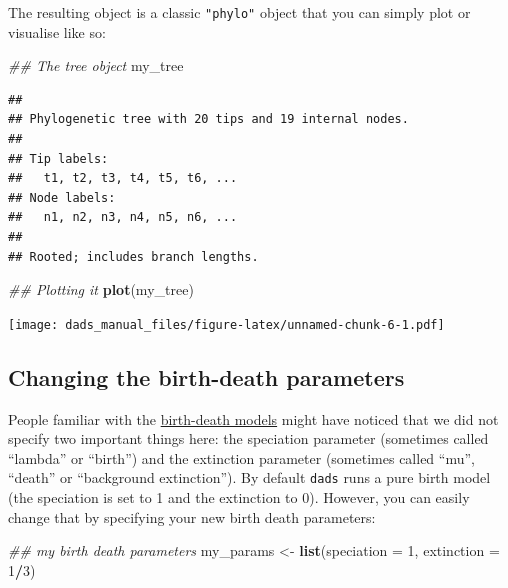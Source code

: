 \documentclass[]{book}
\newenvironment{Shaded}{\begin{snugshade}}{\end{snugshade}}
\newcommand{\CommentTok}[1]{\textcolor[rgb]{0.56,0.35,0.01}{\textit{#1}}}
\newcommand{\DataTypeTok}[1]{\textcolor[rgb]{0.13,0.29,0.53}{#1}}
\newcommand{\DecValTok}[1]{\textcolor[rgb]{0.00,0.00,0.81}{#1}}
\newcommand{\KeywordTok}[1]{\textcolor[rgb]{0.13,0.29,0.53}{\textbf{#1}}}
\newcommand{\NormalTok}[1]{#1}
\newcommand{\OperatorTok}[1]{\textcolor[rgb]{0.81,0.36,0.00}{\textbf{#1}}}
\newcommand{\StringTok}[1]{\textcolor[rgb]{0.31,0.60,0.02}{#1}}
\begin{document}
The resulting object is a classic \texttt{"phylo"} object that you can simply plot or visualise like so:

\begin{Shaded}
\begin{Highlighting}[]
\CommentTok{## The tree object}
\NormalTok{my_tree}
\end{Highlighting}
\end{Shaded}

\begin{verbatim}
## 
## Phylogenetic tree with 20 tips and 19 internal nodes.
## 
## Tip labels:
##   t1, t2, t3, t4, t5, t6, ...
## Node labels:
##   n1, n2, n3, n4, n5, n6, ...
## 
## Rooted; includes branch lengths.
\end{verbatim}

\begin{Shaded}
\begin{Highlighting}[]
\CommentTok{## Plotting it}
\KeywordTok{plot}\NormalTok{(my_tree)}
\end{Highlighting}
\end{Shaded}

\texttt{[image: dads\_manual\_files/figure-latex/unnamed-chunk-6-1.pdf]}

\hypertarget{changing-the-birth-death-parameters}{%
\subsection{Changing the birth-death parameters}\label{changing-the-birth-death-parameters}}

People familiar with the \href{https://lukejharmon.github.io/pcm/chapter10_birthdeath/}{birth-death models} might have noticed that we did not specify two important things here: the speciation parameter (sometimes called ``lambda'' or ``birth'') and the extinction parameter (sometimes called ``mu'', ``death'' or ``background extinction'').
By default \texttt{dads} runs a pure birth model (the speciation is set to 1 and the extinction to 0).
However, you can easily change that by specifying your new birth death parameters:

\begin{Shaded}
\begin{Highlighting}[]
\CommentTok{## my birth death parameters}
\NormalTok{my_params <-}\StringTok{ }\KeywordTok{list}\NormalTok{(}\DataTypeTok{speciation =} \DecValTok{1}\NormalTok{,}
                  \DataTypeTok{extinction =} \DecValTok{1}\OperatorTok{/}\DecValTok{3}\NormalTok{)}
\end{Highlighting}
\end{Shaded}
\end{document}
